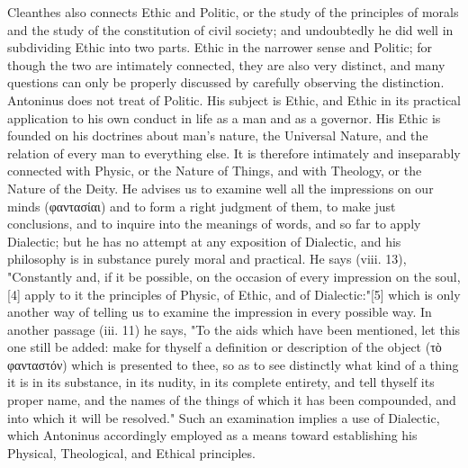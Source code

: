 Cleanthes also connects Ethic and Politic, or the study of the principles of morals and the study of the constitution of civil society; and undoubtedly he did well in subdividing Ethic into two parts. Ethic in the narrower sense and Politic; for though the two are intimately connected, they are also very distinct, and many questions can only be properly discussed by carefully observing the distinction. Antoninus does not treat of Politic. His subject is Ethic, and Ethic in its practical application to his own conduct in life as a man and as a governor. His Ethic is founded on his doctrines about man's nature, the Universal Nature, and the relation of every man to everything else. It is therefore intimately and inseparably connected with Physic, or the Nature of Things, and with Theology, or the Nature of the Deity. He advises us to examine well all the impressions on our minds (\textgreek{φαντασίαι}) and to form a right judgment of them, to make just conclusions, and to inquire into the meanings of words, and so far to apply Dialectic; but he has no attempt at any exposition of Dialectic, and his philosophy is in substance purely moral and practical. He says (viii. 13), "Constantly and, if it be possible, on the occasion of every impression on the soul,[4] apply to it the principles of Physic, of Ethic, and of Dialectic:"[5] which is only another way of telling us to examine the impression in every possible way. In another passage (iii. 11) he says, "To the aids which have been mentioned, let this one still be added: make for thyself a definition or description of the object (\textgreek{τὸ φανταστόν}) which is presented to thee, so as to see distinctly what kind of a thing it is in its substance, in its nudity, in its complete entirety, and tell thyself its proper name, and the names of the things of which it has been compounded, and into which it will be resolved." Such an examination implies a use of Dialectic, which Antoninus accordingly employed as a means toward establishing his Physical, Theological, and Ethical principles.

